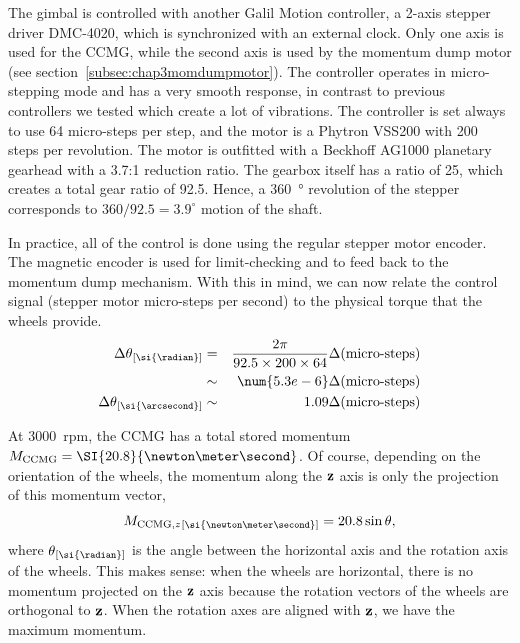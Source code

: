 The gimbal is controlled with another Galil Motion controller, a 2-axis stepper driver DMC-4020, which is synchronized with an external clock. Only one axis is used for the CCMG, while the second axis is used by the momentum dump motor (see section~\ref{subsec:chap3momdumpmotor}). The controller operates in micro-stepping mode and has a very smooth response, in contrast to previous controllers we tested which create a lot of vibrations. The controller is set always to use 64 micro-steps per step, and the motor is a Phytron VSS200 with 200 steps per revolution. The motor is outfitted with a Beckhoff AG1000 planetary gearhead with a 3.7:1 reduction ratio. The gearbox itself has a ratio of 25, which creates a total gear ratio of 92.5. Hence, a \SI{360}{\degree} revolution of the stepper corresponds to $360/92.5=3.9^\circ$ motion of the shaft. %

In practice, all of the control is done using the regular stepper motor encoder. The magnetic encoder is used for limit-checking and to feed back to the momentum dump mechanism. With this in mind, we can now relate the control signal (stepper motor micro-steps per second) to the physical torque that the wheels provide. 
\begin{eqnarray}
\Delta\theta\units{\si{\radian}} &= &\frac{2\pi}{92.5\times 200\times 64}\Delta(\textrm{micro-steps}) \\ 
& \sim & \num{5.3e-6} \Delta(\textrm{micro-steps})\\
\Delta\theta\units{\si{\arcsecond}} &\sim &  1.09 \Delta(\textrm{micro-steps})
\end{eqnarray}

At \num{3000}~rpm, the CCMG has a total stored momentum $\MCCMG= \SI{20.8}{\newton\meter\second}$. Of course, depending on the orientation of the wheels, the momentum along the $\textrm{\textbf{z}}$ axis is only the projection of this momentum vector,
\begin{equation}
\MCCMGz\units{\si{\newton\meter\second}} = 20.8\sin\theta,
\end{equation}
where $\theta\units{\si{\radian}}$ is the angle between the horizontal axis and the rotation axis of the wheels. This makes sense: when the wheels are horizontal, there is no momentum projected on the $\textrm{\textbf{z}}$ axis because the rotation vectors of the wheels are orthogonal to $\textrm{\textbf{z}}$. When the rotation axes are aligned with $\textrm{\textbf{z}}$, we have the maximum momentum. 

